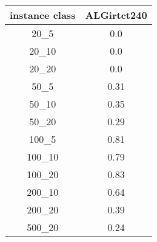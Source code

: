 \begin{tabular}{c|c|}
instance class & ALGirtct240 \\ 
\hline
20_5         & 0.0          \\ 
20_10        & 0.0          \\ 
20_20        & 0.0          \\ 
50_5         & 0.31         \\ 
50_10        & 0.35         \\ 
50_20        & 0.29         \\ 
100_5        & 0.81         \\ 
100_10       & 0.79         \\ 
100_20       & 0.83         \\ 
200_10       & 0.64         \\ 
200_20       & 0.39         \\ 
500_20       & 0.24         \\ 
\end{tabular}